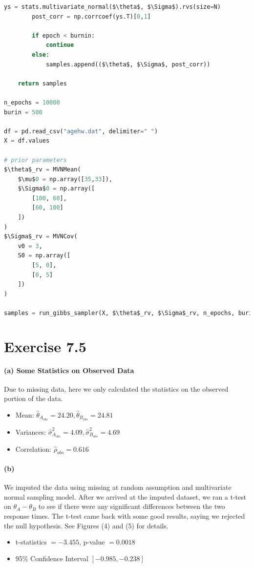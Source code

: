 \documentclass[11pt, letterpaper]{article}
\begin{document}
\begin{lstlisting}[language=Python]
        ys = stats.multivariate_normal($\theta$, $\Sigma$).rvs(size=N)
        post_corr = np.corrcoef(ys.T)[0,1]

        if epoch < burnin:
            continue
        else:
            samples.append(($\theta$, $\Sigma$, post_corr))
    
    return samples

n_epochs = 10000
burin = 500

df = pd.read_csv("agehw.dat", delimiter=" ")
X = df.values

# prior parameters
$\theta$_rv = MVNMean(
    $\mu$0 = np.array([35,33]),
    $\Sigma$0 = np.array([
        [100, 60],
        [60, 100]
    ])
)
$\Sigma$_rv = MVNCov(
    v0 = 3,
    S0 = np.array([
        [5, 0],
        [0, 5]
    ])
)

samples = run_gibbs_sampler(X, $\theta$_rv, $\Sigma$_rv, n_epochs, burin)
\end{lstlisting}

\newpage
\section{Exercise 7.5}
\paragraph{(a) Some Statistics on Observed Data}
Due to missing data, here we only calculated the statistics on the observed portion of the data.
\begin{itemize}
    \item Mean: $\hat{\theta}_{A_{obs}} = 24.20, \hat{\theta}_{B_{obs}} = 24.81$
    \item Variances: $\hat{\sigma}^2_{A_{obs}} = 4.09, \hat{\sigma}^2_{B_{obs}} = 4.69$
    \item Correlation: $\hat{\rho}_{obs} = 0.616$
\end{itemize}

\paragraph{(b)}
We imputed the data using missing at random assumption and multivariate normal sampling model. After we arrived at the imputed dataset, we ran a t-test on $\theta_A - \theta_B$ to see if there were any significant differences between the two response times. The t-test came back with some good results, saying we rejected the null hypothesis. See Figures (4) and (5) for details.
\begin{itemize}
    \item t-statistics $= -3.455$, p-value $= 0.0018$
    \item 95\% Confidence Interval $[-0.985, -0.238]$
\end{itemize}
\end{document}

